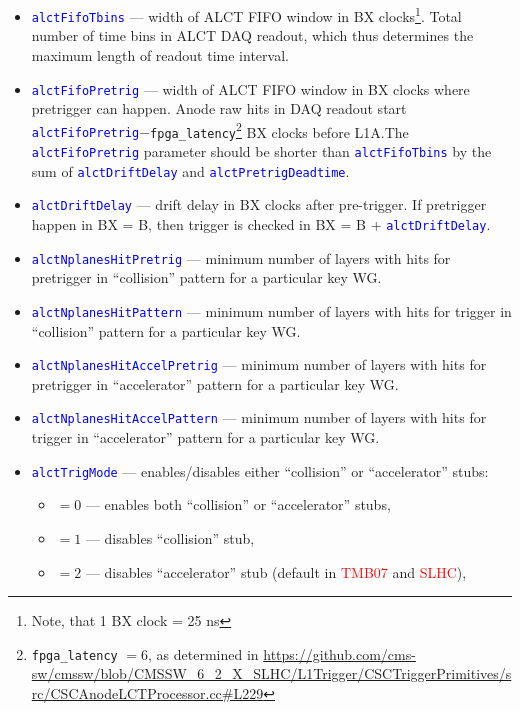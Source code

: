 \begin{itemize}
  \item \textcolor{blue}{\texttt{alctFifoTbins}} --- width of ALCT FIFO window in BX clocks\footnote{Note, that 1 BX clock = 25 ns}. Total number of time bins in ALCT DAQ readout, which thus determines the maximum length of readout time interval.
  \item \textcolor{blue}{\texttt{alctFifoPretrig}} --- width of ALCT FIFO window in BX clocks where pretrigger can happen. Anode raw hits in DAQ readout start \textcolor{blue}{\texttt{alctFifoPretrig}}$-$\texttt{fpga\_latency}\footnote{\texttt{fpga\_latency} $=6$, as determined in \url{https://github.com/cms-sw/cmssw/blob/CMSSW\_6\_2\_X\_SLHC/L1Trigger/CSCTriggerPrimitives/src/CSCAnodeLCTProcessor.cc\#L229}} BX clocks before L1A.The \textcolor{blue}{\texttt{alctFifoPretrig}} parameter should be shorter than \textcolor{blue}{\texttt{alctFifoTbins}} by the sum of \textcolor{blue}{\texttt{alctDriftDelay}} and \textcolor{blue}{\texttt{alctPretrigDeadtime}}.
  \item \textcolor{blue}{\texttt{alctDriftDelay}} --- drift delay in BX clocks after pre-trigger. If pretrigger happen in BX = B, then trigger is checked in BX = B + \textcolor{blue}{\texttt{alctDriftDelay}}.
  \item \textcolor{blue}{\texttt{alctNplanesHitPretrig}} --- minimum number of layers with hits for pretrigger in ``collision'' pattern for a particular key WG.
  \item \textcolor{blue}{\texttt{alctNplanesHitPattern}} --- minimum number of layers with hits for trigger in ``collision'' pattern for a particular key WG.
  \item \textcolor{blue}{\texttt{alctNplanesHitAccelPretrig}} --- minimum number of layers with hits for pretrigger in ``accelerator'' pattern for a particular key WG.
  \item \textcolor{blue}{\texttt{alctNplanesHitAccelPattern}} --- minimum number of layers with hits for trigger in ``accelerator'' pattern for a particular key WG.
  \item \textcolor{blue}{\texttt{alctTrigMode}} --- enables/disables either ``collision'' or ``accelerator'' stubs:
  \begin{itemize}
    \item $=0$ --- enables both ``collision'' or ``accelerator'' stubs,
    \item $=1$ --- disables ``collision'' stub,
    \item $=2$ --- disables ``accelerator'' stub (default in \textcolor{red}{TMB07} and \textcolor{red}{SLHC}),

\end{itemize}
\end{itemize}
